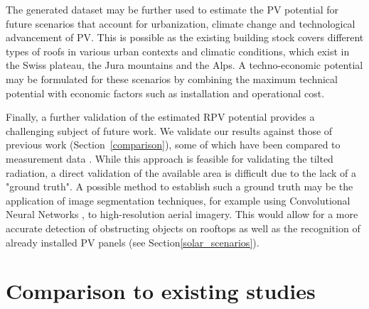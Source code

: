 The generated dataset may be further used to estimate the PV potential for future scenarios that account for urbanization, climate change and technological advancement of PV.
This is possible as the existing building stock covers different types of roofs in various urban contexts and climatic conditions, which exist in the Swiss plateau, the Jura mountains and the Alps. 
A techno-economic potential may be formulated for these scenarios by combining the maximum technical potential with economic factors such as installation and operational cost.

Finally, a further validation of the estimated RPV potential provides a challenging subject of future work. 
We validate our results against those of previous work (Section~\ref{comparison}), some of which have been compared to measurement data \cite{buffat_scalable_2018}. While this approach is feasible for validating the tilted radiation, a direct validation of the available area is difficult due to the lack of a "ground truth". A possible method to establish such a ground truth may be the application of image segmentation techniques, for example using Convolutional Neural Networks \cite{castello_deep_2019}, to high-resolution aerial imagery. 
This would allow for a more accurate detection of obstructing objects on rooftops as well as the recognition of already installed PV panels (see Section\ref{solar_scenarios}).



\section{Comparison to existing studies}
\label{solar_comparison}


